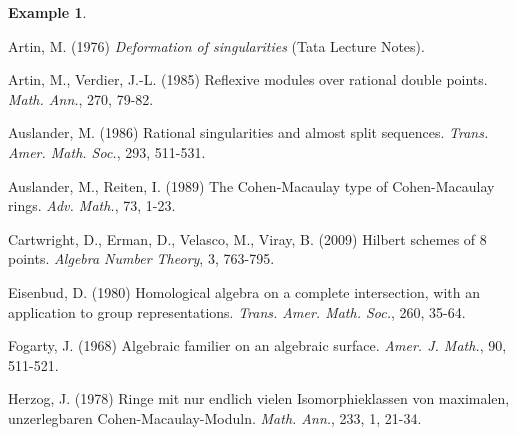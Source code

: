 \documentclass{amsart}[12pt]
\theoremstyle{definition}
\newtheorem{eg}[theorem]{Example}
\theoremstyle{remark}
\numberwithin{equation}{section}
\begin{document}
\begin{eg}
\begin{center}
\end{center}
\end{eg}


\begin{thebibliography}{00}

Artin, M. (1976) \textit{Deformation of singularities} (Tata Lecture Notes).

Artin, M., Verdier, J.-L. (1985) Reflexive modules over rational double points. \textit{Math. Ann.}, 270, 79-82.

Auslander, M. (1986) Rational singularities and almost split sequences. \textit{Trans. Amer. Math. Soc.}, 293, 511-531.

Auslander, M., Reiten, I. (1989) The Cohen-Macaulay type of Cohen-Macaulay rings. \textit{Adv. Math.}, 73, 1-23.

Cartwright, D., Erman, D., Velasco, M., Viray, B. (2009) Hilbert schemes of 8 points. \textit{Algebra Number Theory}, 3, 763-795.

Eisenbud, D. (1980) Homological algebra on a complete intersection, with an application to group representations. \textit{Trans. Amer. Math. Soc.}, 260, 35-64.


Fogarty, J. (1968) Algebraic familier on an algebraic surface. \textit{Amer. J. Math.}, 90, 511-521.


Herzog, J. (1978) Ringe mit nur endlich vielen Isomorphieklassen von maximalen, unzerlegbaren Cohen-Macaulay-Moduln. \textit{Math. Ann.}, 233, 1, 21-34.


\end{thebibliography}
\end{document}
